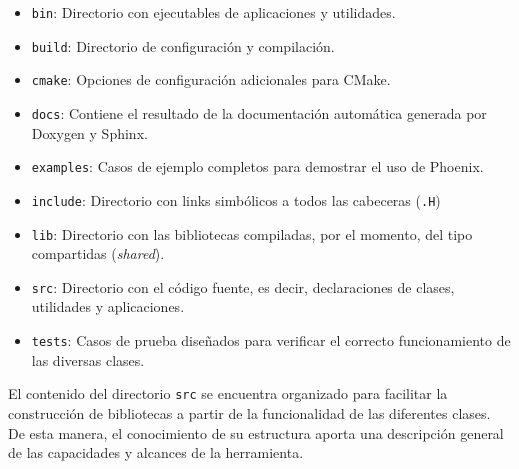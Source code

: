 \begin{itemize}
	\item \texttt{bin}: Directorio con ejecutables de aplicaciones y utilidades.
	\item \texttt{build}: Directorio de configuraci\'on y compilaci\'on.
	\item \texttt{cmake}: Opciones de configuraci\'on adicionales para CMake.
	\item \texttt{docs}: Contiene el resultado de la documentaci\'on autom\'atica generada por Doxygen y Sphinx.
	\item \texttt{examples}: Casos de ejemplo completos para demostrar el uso de Phoenix.
	\item \texttt{include}: Directorio con links simb\'olicos a todos las cabeceras (\texttt{.H})
	\item \texttt{lib}: Directorio con las bibliotecas compiladas, por el momento, del tipo compartidas (\emph{shared}).
	\item \texttt{src}: Directorio con el c\'odigo fuente, es decir, declaraciones de clases, utilidades y aplicaciones.
	\item \texttt{tests}: Casos de prueba dise\~nados para verificar el correcto funcionamiento de las diversas clases.
	
\end{itemize}


El contenido del directorio \texttt{src} se encuentra organizado para facilitar la construcci\'on de bibliotecas a partir de la funcionalidad de las diferentes clases. De esta manera, el conocimiento de su estructura aporta una descripci\'on general de las capacidades y alcances de la herramienta.

